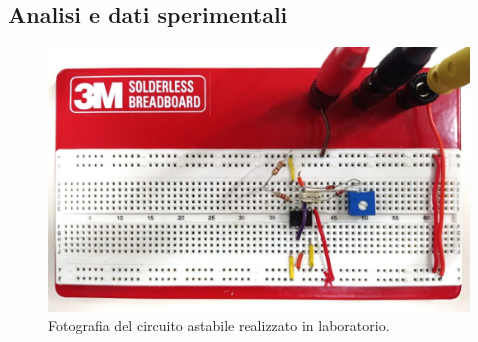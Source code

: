 \documentclass{report}
\begin{document}
\subsection{Analisi e dati sperimentali}
\begin{figure}[h!]
	\centering
	\includegraphics[height=7cm]{immagini/circuito4}
	\caption{Fotografia del circuito astabile realizzato in laboratorio.}
	\label{figura:circuito4}
\end{figure}

\end{document}
